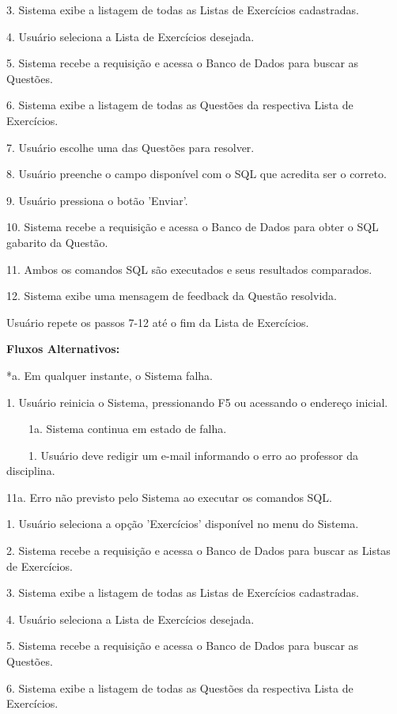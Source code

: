 \documentclass[graduacao,brazil]{ThesisPUC}
\begin{document}
3. Sistema exibe a listagem de todas as Listas de Exerc\'{i}cios cadastradas.

4. Usu\'{a}rio seleciona a Lista de Exerc\'{i}cios desejada.

5. Sistema recebe a requisi\c{c}\~{a}o e acessa o Banco de Dados para buscar as Quest\~{o}es.

6. Sistema exibe a listagem de todas as Quest\~{o}es da respectiva Lista de Exerc\'{i}cios.

7. Usu\'{a}rio escolhe uma das Quest\~{o}es para resolver.

8. Usu\'{a}rio preenche o campo dispon\'{i}vel com o SQL que acredita ser o correto.

9. Usu\'{a}rio pressiona o bot\~{a}o 'Enviar'.

10. Sistema recebe a requisi\c{c}\~{a}o e acessa o Banco de Dados para obter o SQL gabarito da Quest\~{a}o.

11. Ambos os comandos SQL s\~{a}o executados e seus resultados comparados.

12. Sistema exibe uma mensagem de feedback da Quest\~{a}o resolvida.

Usu\'{a}rio repete os passos 7-12 at\'{e} o fim da Lista de Exerc\'{i}cios.


\textbf{Fluxos Alternativos:}

*a. Em qualquer instante, o Sistema falha.

1. Usu\'{a}rio reinicia o Sistema, pressionando F5 ou acessando o endere\c{c}o inicial.

\ \ \ \ 1a. Sistema continua em estado de falha.

\ \ \ \ 1. Usu\'{a}rio deve redigir um e-mail informando o erro ao professor da disciplina.


11a. Erro n\~{a}o previsto pelo Sistema ao executar os comandos SQL.

1. Usu\'{a}rio seleciona a opção 'Exerc\'{i}cios' dispon\'{i}vel no menu do Sistema.

2. Sistema recebe a requisi\c{c}\~{a}o e acessa o Banco de Dados para buscar as Listas de Exerc\'{i}cios.

3. Sistema exibe a listagem de todas as Listas de Exerc\'{i}cios cadastradas.

4. Usu\'{a}rio seleciona a Lista de Exerc\'{i}cios desejada.

5. Sistema recebe a requisi\c{c}\~{a}o e acessa o Banco de Dados para buscar as Quest\~{o}es.

6. Sistema exibe a listagem de todas as Quest\~{o}es da respectiva Lista de Exerc\'{i}cios.
\end{document}
